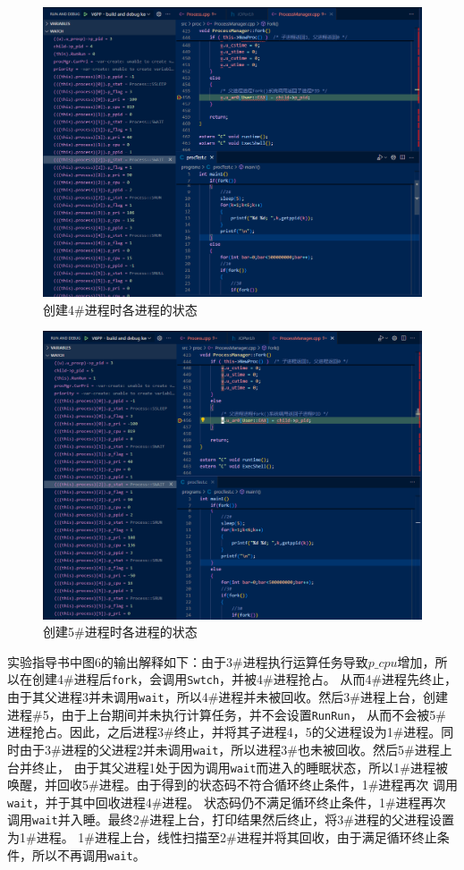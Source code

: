 \begin{figure}[!htbp]
    \centering
    \includegraphics[width=\textwidth]{images/fork4.png}
    \caption{创建4\#进程时各进程的状态}\label{fork4}
\end{figure}

\begin{figure}[!htbp]
    \centering
    \includegraphics[width=\textwidth]{images/fork5.png}
    \caption{创建5\#进程时各进程的状态}\label{fork5}
\end{figure}

实验指导书中图6的输出解释如下：由于3\#进程执行运算任务导致$p\_cpu$增加，所以在创建4\#进程后\texttt{fork}，会调用\texttt{Swtch}，并被4\#进程抢占。
从而4\#进程先终止，由于其父进程3并未调用\texttt{wait}，所以4\#进程并未被回收。然后3\#进程上台，创建进程\#5，由于上台期间并未执行计算任务，并不会设置\texttt{RunRun}，
从而不会被5\#进程抢占。因此，之后进程3\#终止，并将其子进程4，5的父进程设为1\#进程。同时由于3\#进程的父进程2并未调用\texttt{wait}，所以进程3\#也未被回收。然后5\#进程上台并终止，
由于其父进程1处于因为调用\texttt{wait}而进入的睡眠状态，所以1\#进程被唤醒，并回收5\#进程。由于得到的状态码不符合循环终止条件，1\#进程再次
调用\texttt{wait}，并于其中回收进程4\#进程。
状态码仍不满足循环终止条件，1\#进程再次调用\texttt{wait}并入睡。最终2\#进程上台，打印结果然后终止，将3\#进程的父进程设置为1\#进程。
1\#进程上台，线性扫描至2\#进程并将其回收，由于满足循环终止条件，所以不再调用\texttt{wait}。

